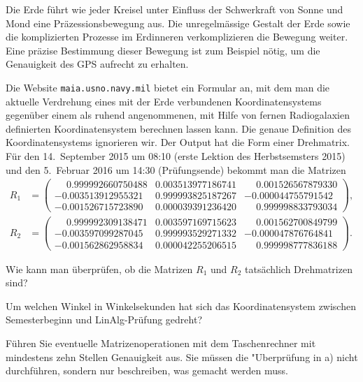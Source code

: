 Die Erde führt wie jeder Kreisel unter Einfluss der Schwerkraft von
Sonne und Mond eine Präzessionsbewegung aus.
Die unregelmässige Gestalt der Erde sowie die komplizierten Prozesse
im Erdinneren verkomplizieren die Bewegung weiter.
Eine präzise Bestimmung dieser Bewegung ist zum Beispiel nötig, um
die Genauigkeit des GPS aufrecht zu erhalten.

Die Website \texttt{maia.usno.navy.mil} bietet
ein Formular an, mit dem man die aktuelle Verdrehung eines
mit der Erde verbundenen Koordinatensystems gegenüber einem als
ruhend angenommenen, mit Hilfe von fernen Radiogalaxien definierten
Koordinatensystem berechnen lassen kann.
Die genaue Definition des Koordinatensystems ignorieren wir.
Der Output hat die Form einer Drehmatrix.
Für den 14.~September 2015 um 08:10 (erste Lektion des Herbstsemsters 2015)
und den 5.~Februar 2016 um 14:30 (Prüfungsende) bekommt man die Matrizen
\begin{align*}
R_1 &= \begin{pmatrix}
\phantom{-}0.999992660750488&0.003513977186741&\phantom{-}0.001526567879330\\
          -0.003513912955321&0.999993825187267&          -0.000044755791542\\
          -0.001526715723890&0.000039391236420&\phantom{-}0.999998833793034
\end{pmatrix},
\tag{2015-09-14 08:10}
\\
R_2 &= \begin{pmatrix}
\phantom{-}0.999992309138471&0.003597169715623&\phantom{-}0.001562700849799\\
          -0.003597099287045&0.999993529271332&          -0.000047876764841\\
          -0.001562862958834&0.000042255206515&\phantom{-}0.999998777836188
\end{pmatrix}.
\tag{2016-02-05 14:30}
\end{align*}
\begin{teilaufgaben}
\item
Wie kann man überprüfen, ob die Matrizen $R_1$ und $R_2$ tatsächlich
Drehmatrizen sind?
\item
Um welchen Winkel in Winkelsekunden hat sich das Koordinatensystem
zwischen Semesterbeginn und LinAlg-Prüfung gedreht?
\end{teilaufgaben}


\begin{hinweis}
Führen Sie eventuelle Matrizenoperationen mit dem Taschenrechner
mit mindestens zehn Stellen Genauigkeit aus.
Sie müssen die "Uberprüfung in a) nicht durchführen, sondern nur
beschreiben, was gemacht werden muss.
\end{hinweis}


